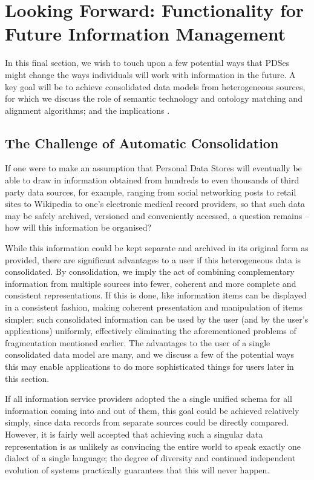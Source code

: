 \documentclass[graybox]{svmult}
\begin{document}
\section{Looking Forward: Functionality for Future Information Management}

In this final section, we wish to touch upon a few potential ways that PDSes might change the ways individuals will work with information in the future.  A key goal will be to achieve consolidated data models from heterogeneous sources, for which we discuss the role of semantic technology and ontology matching and alignment algorithms; and the implications .

\subsection{The Challenge of Automatic Consolidation}

If one were to make an assumption that Personal Data Stores will eventually be able to draw in information obtained from hundreds to even thousands of third party data sources, for example, ranging from social networking posts to retail sites to Wikipedia to one’s electronic medical record providers, so that such data may be safely archived, versioned and conveniently accessed, a question remains -- how will this information be organised?

While this information could be kept separate and archived in its original form as provided, there are significant advantages to a user if this heterogeneous data is consolidated.  By consolidation, we imply the act of combining complementary information from multiple sources into fewer, coherent and more complete and consistent representations.  If this is done, like information items can be displayed in a consistent fashion, making coherent presentation and manipulation of items simpler; such consolidated information can be used by the user (and by the user’s applications) uniformly, effectively eliminating the  aforementioned problems of fragmentation mentioned earlier. The advantages to the user of  a single consolidated data model are many, and we discuss a few of the potential ways this may enable applications to do more sophisticated things for users later in this section.

If all information service providers adopted the a single unified schema for all information coming into and out of them, this goal could be achieved relatively simply, since data records from separate sources could be directly compared.  However, it is fairly well accepted that achieving such a singular data representation is as unlikely as convincing the entire world to speak exactly one dialect of a single language; the degree of diversity and continued independent evolution of systems practically guarantees that this will never happen\cite{bannon1997constructing}. 
\end{document}
